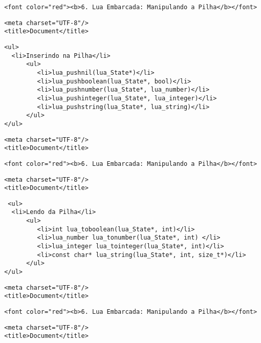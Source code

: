 \documentclass[11pt]{article}
\begin{document}
\begin{verbatim}
 <font color="red"><b>6. Lua Embarcada: Manipulando a Pilha</b></font>    
\end{verbatim}

    \begin{verbatim}
 <meta charset="UTF-8"/>
 <title>Document</title>
\end{verbatim}

\begin{verbatim}
 <ul>
   <li>Inserindo na Pilha</li>
       <ul>
          <li>lua_pushnil(lua_State*)</li> 
          <li>lua_pushboolean(lua_State*, bool)</li> 
          <li>lua_pushnumber(lua_State*, lua_number)</li>
          <li>lua_pushinteger(lua_State*, lua_integer)</li>
          <li>lua_pushstring(lua_State*, lua_string)</li>
       </ul>         
 </ul>      
\end{verbatim}

    \begin{verbatim}
 <meta charset="UTF-8"/>
 <title>Document</title>
\end{verbatim}

\begin{verbatim}
 <font color="red"><b>6. Lua Embarcada: Manipulando a Pilha</b></font>    
\end{verbatim}

    \begin{verbatim}
 <meta charset="UTF-8"/>
 <title>Document</title>
\end{verbatim}

\begin{verbatim}
  <ul>
   <li>Lendo da Pilha</li>
       <ul>
          <li>int lua_toboolean(lua_State*, int)</li> 
          <li>lua_number lua_tonumber(lua_State*, int) </li> 
          <li>lua_integer lua_tointeger(lua_State*, int)</li>
          <li>const char* lua_string(lua_State*, int, size_t*)</li>
       </ul>         
 </ul>  
\end{verbatim}

    \begin{verbatim}
 <meta charset="UTF-8"/>
 <title>Document</title>
\end{verbatim}

\begin{verbatim}
 <font color="red"><b>6. Lua Embarcada: Manipulando a Pilha</b></font>    
\end{verbatim}

    \begin{verbatim}
 <meta charset="UTF-8"/>
 <title>Document</title>
\end{verbatim}
\end{document}
